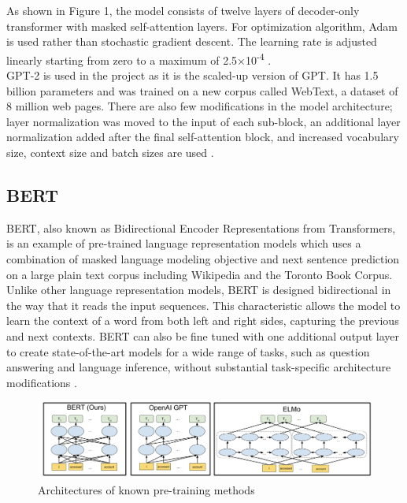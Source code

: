 \documentclass{article}
\begin{document}
As shown in Figure 1, the model consists of twelve layers of decoder-only transformer with masked self-attention layers. For optimization algorithm, Adam is used rather than stochastic gradient descent. The learning rate is adjusted linearly starting from zero to a maximum of 2.5×10\textsuperscript{-4} \cite{gpt}. \\

GPT-2 is used in the project as it is the scaled-up version of GPT. It has 1.5 billion parameters and was trained on a new corpus called WebText, a dataset of 8 million web pages. There are also few modifications in the model architecture; layer normalization was moved to the input of each sub-block, an additional layer normalization added after the final self-attention block, and increased vocabulary size, context size and batch sizes are used \cite{gpt2}.

\subsection*{BERT }

BERT, also known as Bidirectional Encoder Representations from Transformers, is an example of pre-trained language representation models which uses a combination of masked language modeling objective and next sentence prediction on a large plain text corpus including Wikipedia and the Toronto Book Corpus. Unlike other language representation models, BERT is designed bidirectional in the way that it reads the input sequences. This characteristic allows the model to learn the context of a word from both left and right sides, capturing the previous and next contexts. BERT can also be fine tuned with one additional output layer to create state-of-the-art models for a wide range of tasks, such as question answering and language inference, without substantial task-specific architecture modifications \cite{devlin2019bert}. \\

\begin{figure}[H]
	\centering
	\includegraphics[scale=0.2]{bert.png}
	\caption{Architectures of known pre-training methods}
	\label{fig:mesh1}
\end{figure}
\end{document}
